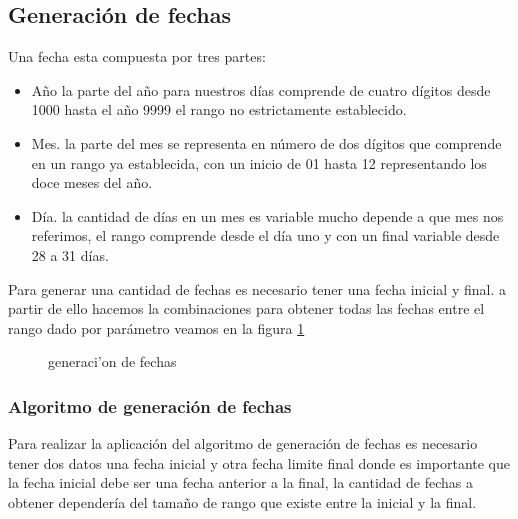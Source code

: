 \subsection{Generaci\'on de fechas}
Una fecha esta compuesta por tres partes:
\begin{itemize}
\item A\~no la parte del a\~no para nuestros d\'ias comprende de cuatro d\'igitos desde 1000 hasta el a\~no 9999 el rango no estrictamente establecido.
\item
Mes. la parte del mes se representa en n\'umero de dos d\'igitos que comprende en un rango ya establecida, con un inicio de 01 hasta 12 representando los doce meses del a\~no.
\item
 D\'ia. la cantidad de d\'ias en un mes es variable mucho depende a que mes nos referimos, el rango comprende desde el d\'ia uno y con un final variable desde 28 a 31 d\'ias.
\end{itemize}
Para generar una cantidad de fechas es necesario tener una fecha inicial y final. a partir de ello hacemos la combinaciones para obtener todas las fechas entre el rango dado por par\'ametro veamos en la figura \ref{fig:generacion de fechas}
\begin{figure}[H]
\centering
{}
\caption{generaci'on de fechas} \label{fig:generacion de fechas}
\end{figure}
\subsubsection{Algoritmo de generaci\'on de fechas}
Para realizar la aplicaci\'on del algoritmo de generaci\'on de fechas es necesario tener dos datos una fecha inicial y otra fecha limite final donde es importante que la fecha inicial debe ser una fecha anterior a la final, la cantidad de fechas a obtener depender\'ia del tama\~no de rango que existe entre la inicial y la final.

